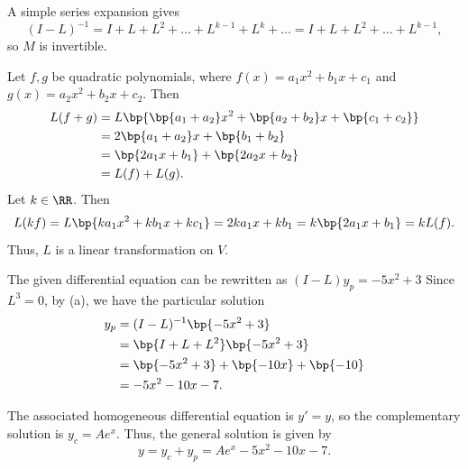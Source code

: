 \begin{solution}
    \begin{ppart}
        A simple series expansion gives \[(I - L)^{-1} = I + L + L^2 + \dots + L^{k-1} + L^k + \dots = I + L + L^2 + \dots + L^{k-1},\] so $M$ is invertible.
    \end{ppart}
    \begin{ppart}
        Let $f, g$ be quadratic polynomials, where $f(x) = a_1 x^2 + b_1x + c_1$ and $g(x) = a_2 x^2 + b_2 x + c_2$. Then
        \begin{align*}
            L(f + g) &= L\bp{\bp{a_1 + a_2} x^2 + \bp{a_2 + b_2} x + \bp{c_1 + c_2}}\\
            &= 2\bp{a_1 + a_2}x + \bp{b_1 + b_2}\\
            &= \bp{2a_1x + b_1} + \bp{2a_2x + b_2}\\
            &= L(f) + L(g).
        \end{align*}
        Let $k \in \RR$. Then \[L(kf) = L\bp{ka_1 x^2 + kb_1 x + kc_1} = 2ka_1 x + kb_1 = k\bp{2a_1 x + b_1} = k L(f).\] Thus, $L$ is a linear transformation on $V$.
    \end{ppart}
    \begin{ppart}
        The given differential equation can be rewritten as $(I-L) y_p = -5x^2 + 3$ Since $L^3 = 0$, by (a), we have the particular solution
        \begin{align*}
            y_p &= (I-L)^{-1} \bp{-5x^2 + 3}\\
            &= \bp{I + L + L^2} \bp{-5x^2 + 3}\\
            &= \bp{-5x^2 + 3} + \bp{-10x} + \bp{-10}\\
            &= -5x^2 -10x - 7.
        \end{align*}
    \end{ppart}
    \begin{ppart}
        The associated homogeneous differential equation is $y' = y$, so the complementary solution is $y_c = Ae^x$. Thus, the general solution is given by \[y = y_c + y_p = Ae^x - 5x^2 - 10 x - 7.\] 
    \end{ppart}
\end{solution}